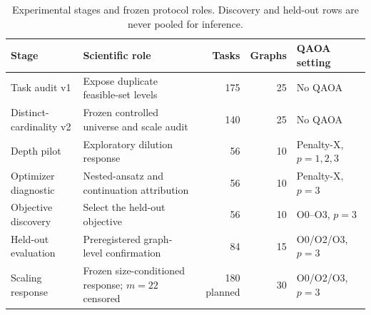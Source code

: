 
\begin{table}[t]
\centering
\caption{Experimental stages and frozen protocol roles. Discovery and held-out rows are never pooled for inference.}
\label{tab:protocol-summary}
\small
\begin{tabularx}{\textwidth}{@{}lXrrl@{}}
\toprule
Stage & Scientific role & Tasks & Graphs & QAOA setting \\
\midrule
Task audit v1 & Expose duplicate feasible-set levels & 175 & 25 & No QAOA \\
Distinct-cardinality v2 & Frozen controlled universe and scale audit & 140 & 25 & No QAOA \\
Depth pilot & Exploratory dilution response & 56 & 10 & Penalty-X, $p=1,2,3$ \\
Optimizer diagnostic & Nested-ansatz and continuation attribution & 56 & 10 & Penalty-X, $p=3$ \\
Objective discovery & Select the held-out objective & 56 & 10 & O0--O3, $p=3$ \\
Held-out evaluation & Preregistered graph-level confirmation & 84 & 15 & O0/O2/O3, $p=3$ \\
Scaling response & Frozen size-conditioned response; $m=22$ censored & 180 planned & 30 & O0/O2/O3, $p=3$ \\
\bottomrule
\end{tabularx}
\end{table}
